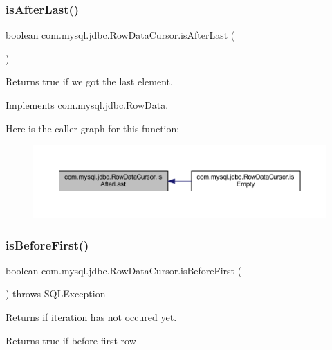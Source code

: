 \subsubsection{\texorpdfstring{is\+After\+Last()}{isAfterLast()}}
{\footnotesize\ttfamily boolean com.\+mysql.\+jdbc.\+Row\+Data\+Cursor.\+is\+After\+Last (\begin{DoxyParamCaption}{ }\end{DoxyParamCaption})}

Returns true if we got the last element. 

Implements \mbox{\hyperlink{interfacecom_1_1mysql_1_1jdbc_1_1_row_data_ab19688b6d0fbdc4e9b7589e099f28ff7}{com.\+mysql.\+jdbc.\+Row\+Data}}.

Here is the caller graph for this function\+:
\nopagebreak
\begin{figure}[H]
\begin{center}
\leavevmode
\includegraphics[width=350pt]{classcom_1_1mysql_1_1jdbc_1_1_row_data_cursor_a10bcae5f8f9281ca74dae8f107f8ebed_icgraph}
\end{center}
\end{figure}
\mbox{\label{classcom_1_1mysql_1_1jdbc_1_1_row_data_cursor_a1c63929717c789969a16960cc340bdad}} 
\subsubsection{\texorpdfstring{is\+Before\+First()}{isBeforeFirst()}}
{\footnotesize\ttfamily boolean com.\+mysql.\+jdbc.\+Row\+Data\+Cursor.\+is\+Before\+First (\begin{DoxyParamCaption}{ }\end{DoxyParamCaption}) throws S\+Q\+L\+Exception}

Returns if iteration has not occured yet.

\begin{DoxyReturn}{Returns}
true if before first row 
\end{DoxyReturn}

